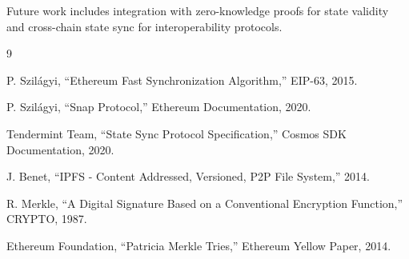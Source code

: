 \documentclass[11pt,a4paper]{article}
\begin{document}
Future work includes integration with zero-knowledge proofs for state validity and cross-chain state sync for interoperability protocols.

\begin{thebibliography}{9}

P. Szilágyi, ``Ethereum Fast Synchronization Algorithm,'' EIP-63, 2015.

P. Szilágyi, ``Snap Protocol,'' Ethereum Documentation, 2020.

Tendermint Team, ``State Sync Protocol Specification,'' Cosmos SDK Documentation, 2020.

J. Benet, ``IPFS - Content Addressed, Versioned, P2P File System,'' 2014.

R. Merkle, ``A Digital Signature Based on a Conventional Encryption Function,'' CRYPTO, 1987.

Ethereum Foundation, ``Patricia Merkle Tries,'' Ethereum Yellow Paper, 2014.

\end{thebibliography}
\end{document}
